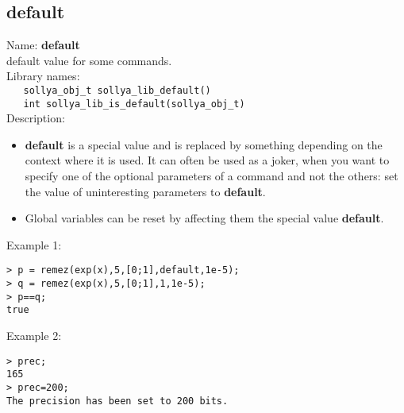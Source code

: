 \subsection{default}
\label{labdefault}
\noindent Name: \textbf{default}\\
\phantom{aaa}default value for some commands.\\[0.2cm]
\noindent Library names:\\
\verb|   sollya_obj_t sollya_lib_default()|\\
\verb|   int sollya_lib_is_default(sollya_obj_t)|\\[0.2cm]
\noindent Description: \begin{itemize}

\item \textbf{default} is a special value and is replaced by something depending on the 
   context where it is used. It can often be used as a joker, when you want to 
   specify one of the optional parameters of a command and not the others: set 
   the value of uninteresting parameters to \textbf{default}.

\item Global variables can be reset by affecting them the special value \textbf{default}.
\end{itemize}
\noindent Example 1: 
\begin{center}\begin{minipage}{15cm}\begin{Verbatim}[frame=single]
> p = remez(exp(x),5,[0;1],default,1e-5);
> q = remez(exp(x),5,[0;1],1,1e-5);
> p==q;
true
\end{Verbatim}
\end{minipage}\end{center}
\noindent Example 2: 
\begin{center}\begin{minipage}{15cm}\begin{Verbatim}[frame=single]
> prec;
165
> prec=200;
The precision has been set to 200 bits.
\end{Verbatim}
\end{minipage}\end{center}
